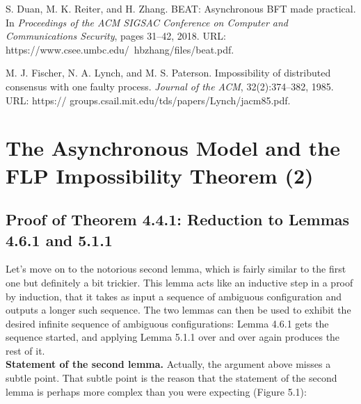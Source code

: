 \begingroup
\let\clearpage\relax
\begin{thebibliography}{5}
S. Duan, M. K. Reiter, and H. Zhang. BEAT: Asynchronous BFT made practical. In \textit{Proceedings of the ACM SIGSAC Conference on Computer and Communications Security},
pages 31–42, 2018. URL: https://www.csee.umbc.edu/~hbzhang/files/beat.pdf.

M. J. Fischer, N. A. Lynch, and M. S. Paterson. Impossibility of distributed consensus
with one faulty process. \textit{Journal of the ACM}, 32(2):374–382, 1985. URL: https://
groups.csail.mit.edu/tds/papers/Lynch/jacm85.pdf.

\end{thebibliography}
\endgroup

\newpage
\chapter{The Asynchronous Model and the FLP Impossibility Theorem (2)}
\section{Proof of Theorem 4.4.1: Reduction to Lemmas 4.6.1 and 5.1.1}
Let’s move on to the notorious second lemma, which is fairly similar to the first one but
definitely a bit trickier. This lemma acts like an inductive step in a proof by induction, that it takes as input a sequence of ambiguous configuration and outputs a longer such sequence. The two lemmas can then be used to exhibit the desired infinite sequence of
ambiguous configurations: Lemma 4.6.1 gets the sequence started, and applying Lemma 5.1.1 over and over again produces the rest of it.\\

\noindent
\textbf{Statement of the second lemma.} Actually, the argument above misses a subtle point.
That subtle point is the reason that the statement of the second lemma is perhaps more complex
than you were expecting (Figure 5.1):


